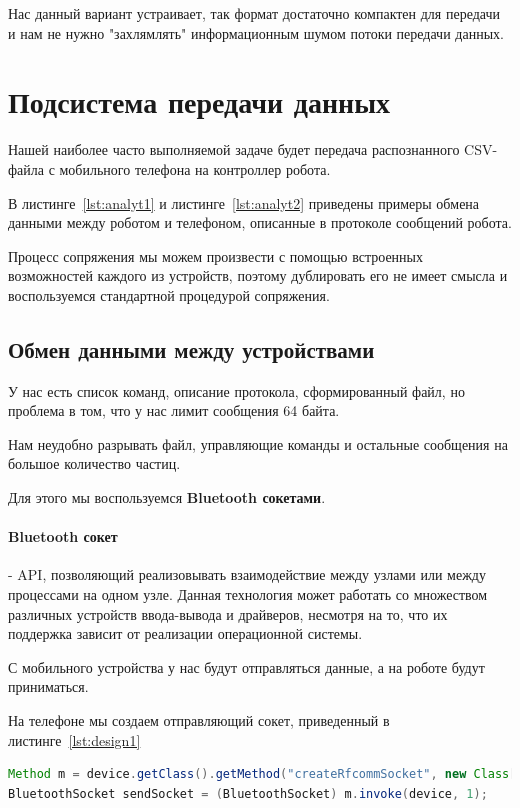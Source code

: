 Нас данный вариант устраивает, так формат достаточно компактен для передачи и нам не нужно "захлямлять" информационным шумом потоки передачи данных. 

\section{Подсистема передачи данных}

Нашей наиболее часто выполняемой задаче будет передача распознанного CSV-файла с мобильного телефона на контроллер робота.

В листинге~\ref{lst:analyt1} и листинге~\ref{lst:analyt2} приведены примеры обмена данными между роботом и телефоном, описанные в протоколе сообщений робота.

Процесс сопряжения мы можем произвести с помощью встроенных возможностей каждого из устройств, поэтому дублировать его не имеет смысла и воспользуемся стандартной процедурой сопряжения.

\subsection{Обмен данными между устройствами}

У нас есть список команд, описание протокола, сформированный файл, но проблема в том, что у нас лимит сообщения 64 байта.

Нам неудобно разрывать файл, управляющие команды и остальные сообщения на большое количество частиц.

Для этого мы воспользуемся \textbf{Bluetooth сокетами}.

\paragraph{Bluetooth сокет} -  API, позволяющий реализовывать взаимодействие между узлами или между процессами на одном узле. Данная технология может работать со множеством различных устройств ввода-вывода и драйверов, несмотря на то, что их поддержка зависит от реализации операционной системы.

С мобильного устройства у нас будут отправляться данные, а на роботе будут приниматься.

На телефоне мы создаем отправляющий сокет, приведенный в листинге~\ref{lst:design1} 

\begin{lstlisting}[caption={Создаем сокет с данными для отправки}, label=lst:design1, language=Java]
Method m = device.getClass().getMethod("createRfcommSocket", new Class[] { int.class }); 
BluetoothSocket sendSocket = (BluetoothSocket) m.invoke(device, 1);
\end{lstlisting}

